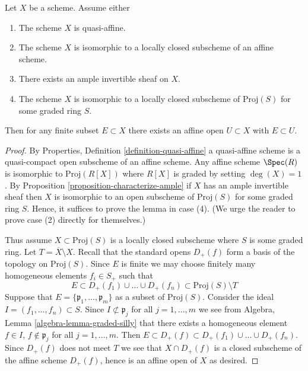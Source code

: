 \begin{lemma}
\label{lemma-ample-finite-set-in-affine}
Let $X$ be a scheme. Assume either
\begin{enumerate}
\item The scheme $X$ is quasi-affine.
\item The scheme $X$ is isomorphic to a locally closed subscheme
of an affine scheme.
\item There exists an ample invertible sheaf on $X$.
\item The scheme $X$ is isomorphic to a locally closed subscheme
of $\text{Proj}(S)$ for some graded ring $S$.
\end{enumerate}
Then for any finite subset $E \subset X$ there exists an
affine open $U \subset X$ with $E \subset U$.
\end{lemma}

\begin{proof}
By Properties, Definition \ref{definition-quasi-affine}
a quasi-affine scheme is a quasi-compact open subscheme
of an affine scheme. Any affine scheme $\Spec(R)$ is isomorphic to
$\text{Proj}(R[X])$ where $R[X]$ is graded by setting $\deg(X) = 1$.
By Proposition \ref{proposition-characterize-ample}
if $X$ has an ample invertible sheaf then $X$ is isomorphic to an open
subscheme of $\text{Proj}(S)$ for some graded ring $S$.
Hence, it suffices to prove the lemma in case (4).
(We urge the reader to prove case (2) directly for themselves.)

\medskip\noindent
Thus assume $X \subset \text{Proj}(S)$ is a locally closed subscheme
where $S$ is some graded ring. Let $T = \overline{X} \setminus X$.
Recall that the standard opens $D_{+}(f)$ form a basis of the
topology on $\text{Proj}(S)$. Since $E$ is finite we may choose finitely many
homogeneous elements $f_i \in S_{+}$ such that
$$
E \subset
D_{+}(f_1) \cup \ldots \cup D_{+}(f_n) \subset
\text{Proj}(S) \setminus T
$$
Suppose that $E = \{\mathfrak p_1, \ldots, \mathfrak p_m\}$
as a subset of $\text{Proj}(S)$.
Consider the ideal $I = (f_1, \ldots, f_n) \subset S$.
Since $I \not \subset \mathfrak p_j$ for all $j = 1, \ldots, m$
we see from Algebra, Lemma \ref{algebra-lemma-graded-silly} that
there exists a homogeneous element $f \in I$, $f \not \in \mathfrak p_j$
for all $j = 1, \ldots, m$. Then $E \subset D_{+}(f) \subset
D_{+}(f_1) \cup \ldots \cup D_{+}(f_n)$. Since $D_{+}(f)$ does not
meet $T$ we see that $X \cap D_{+}(f)$ is a closed subscheme of the
affine scheme $D_{+}(f)$, hence is an affine open of $X$ as desired.
\end{proof}

